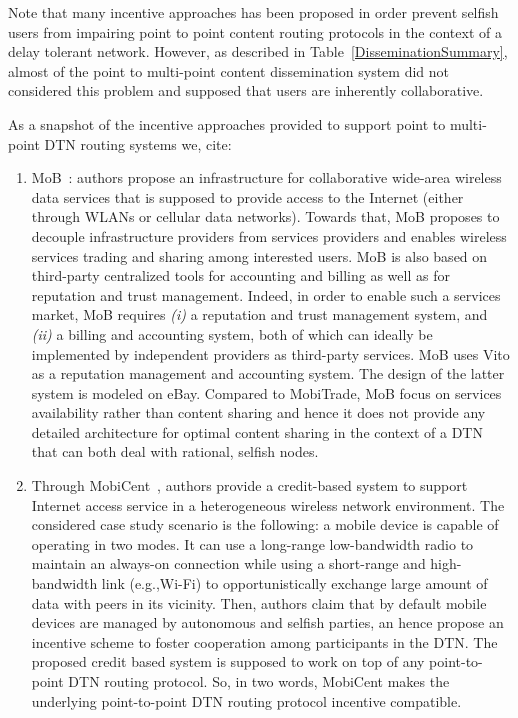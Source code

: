 Note that many incentive approaches has been proposed in order prevent selfish users from impairing point to point content routing protocols in the context of a delay tolerant network. However, as described in Table~\ref{DisseminationSummary}, almost of the point to multi-point content dissemination system did not considered this problem and supposed that users are inherently collaborative.

As a snapshot of the incentive approaches provided to support point to multi-point DTN routing systems we, cite:
\begin{enumerate}

\item MoB~\cite{MoB}: authors propose an infrastructure for collaborative wide-area wireless data services that is supposed to provide access to the Internet (either through WLANs or cellular data networks). Towards that,  MoB proposes to decouple infrastructure providers from services providers and enables wireless services trading and sharing among interested users. MoB is also based on third-party centralized tools for accounting and billing as well as for reputation and trust management. Indeed, in order to enable such a services market, MoB requires \emph{(i)} a reputation and trust management system, and \emph{(ii)} a billing and accounting system, both of which can ideally be implemented by independent providers as third-party services. MoB uses Vito as a reputation management and accounting system. The design of the latter system is modeled on eBay. Compared to MobiTrade, MoB focus on services availability rather than content sharing and hence it does not provide any detailed architecture for optimal content sharing in the context of a DTN that can both deal with rational, selfish nodes.

\item Through MobiCent~\cite{MobiCent}, authors provide a credit-based system to support Internet access service in a heterogeneous wireless network environment. The considered case study scenario is the following: a mobile device is capable of operating in two modes. It can use a long-range low-bandwidth radio to maintain an always-on connection while using a short-range and high-bandwidth link (e.g.,Wi-Fi) to opportunistically exchange large amount of data with peers in its vicinity. Then, authors
claim that by default mobile devices are managed by autonomous and selfish parties, an hence propose an incentive scheme to foster cooperation among participants in the DTN. The proposed credit based system is supposed to work on top of any point-to-point DTN routing protocol. So, in two words, MobiCent makes the underlying point-to-point DTN routing protocol incentive compatible. 


\end{enumerate}

